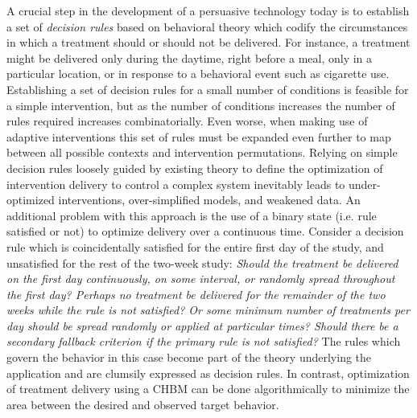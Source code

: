 \documentclass[runningheads,a4paper]{llncs}
\begin{document}
A crucial step in the development of a persuasive technology today is to establish a set of \emph{decision rules} based on behavioral theory which codify the circumstances in which a treatment should or should not be delivered.
For instance, a treatment might be delivered only during the daytime, right before a meal, only in a particular location, or in response to a behavioral event such as cigarette use.
Establishing a set of decision rules for a small number of conditions is feasible for a simple intervention, but as the number of conditions increases the number of rules required increases combinatorially.
Even worse, when making use of adaptive interventions this set of rules must be expanded even further to map between all possible contexts and intervention permutations.
Relying on simple decision rules loosely guided by existing theory to define the optimization of intervention delivery to control a complex system inevitably leads to under-optimized interventions, over-simplified models, and weakened data.
An additional problem with this approach is the use of a binary state (i.e. rule satisfied or not) to optimize delivery over a continuous time.
Consider a decision rule which is coincidentally satisfied for the entire first day of the study, and unsatisfied for the rest of the two-week study:
\emph{Should the treatment be delivered on the first day continuously, on some interval, or randomly spread throughout the first day?
Perhaps no treatment be delivered for the remainder of the two weeks while the rule is not satisfied?
Or some minimum number of treatments per day should be spread randomly or applied at particular times?
Should there be a secondary fallback criterion if the primary rule is not satisfied?}
The rules which govern the behavior in this case become part of the theory underlying the application and are clumsily expressed as decision rules.
In contrast, optimization of treatment delivery using a CHBM can be done algorithmically to minimize the area between the desired and observed target behavior.
\end{document}
